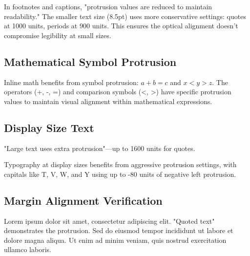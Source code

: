 \documentclass{article}
\begin{document}
\footnotesize
In footnotes and captions, "protrusion values are reduced to maintain readability." The smaller text size (8.5pt) uses more conservative settings: quotes at 1000 units, periods at 900 units. This ensures the optical alignment doesn't compromise legibility at small sizes.
\normalsize

\subsection{Mathematical Symbol Protrusion}

Inline math benefits from symbol protrusion: $a + b = c$ and $x < y > z$. The operators (+, -, =) and comparison symbols (<, >) have specific protrusion values to maintain visual alignment within mathematical expressions.

\subsection{Display Size Text}

{\Large "Large text uses extra protrusion"---up to 1600 units for quotes.}

{\huge T}ypography at display sizes benefits from aggressive protrusion settings, with capitals like T, V, W, and Y using up to -80 units of negative left protrusion.

\subsection{Margin Alignment Verification}

Lorem ipsum dolor sit amet, consectetur adipiscing elit. "Quoted text" demonstrates the protrusion. Sed do eiusmod tempor incididunt ut labore et dolore magna aliqua. Ut enim ad minim veniam, quis nostrud exercitation ullamco laboris.
\end{document}
